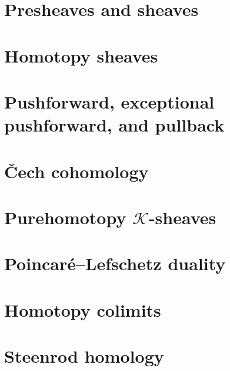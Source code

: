 %


\chapter{Presheaves and sheaves}



\chapter{Homotopy sheaves}



\chapter{Pushforward, exceptional pushforward, and pullback}



\chapter{\v{C}ech cohomology}



\chapter{Purehomotopy $\mathcal{K}$-sheaves}



\chapter{Poincaré–Lefschetz duality}



\chapter{Homotopy colimits}



\chapter{Steenrod homology}



